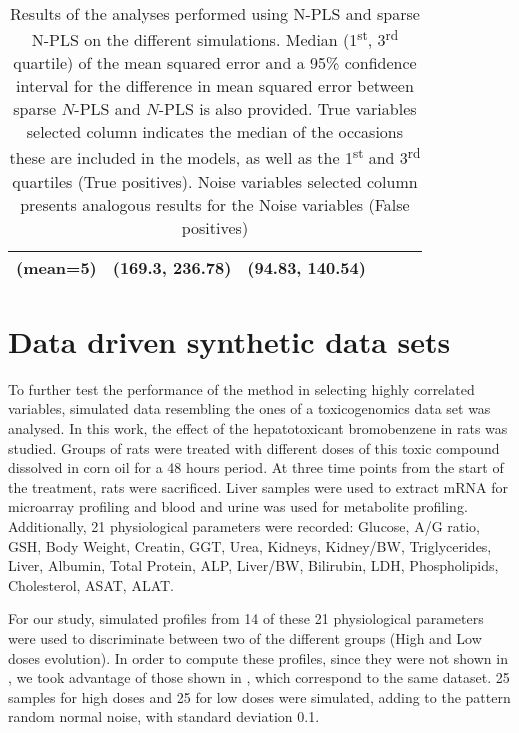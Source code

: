 \begin{table}[hbtp]
{\begin{tabular}{@{}lccccc@{}}
(mean=5)             & (169.3, 236.78)  & (94.83, 140.54) &                                                                           &                                                                            &                                                                             \\ \bottomrule
\end{tabular}%
}
\caption{Results of the analyses performed using N-PLS and sparse N-PLS on the different simulations. Median (1\textsuperscript{st}, 3\textsuperscript{rd} quartile) of the mean squared error and a 95\% confidence interval for the difference in mean squared error between sparse $N$-PLS and $N$-PLS is also provided. True variables selected column indicates the median of the occasions these are included in the models, as well as the 1\textsuperscript{st} and 3\textsuperscript{rd} quartiles (True positives). Noise variables selected column presents analogous results for the Noise variables (False positives)}
\label{table:results_synthetic}
\end{table}

\section{Data driven synthetic data sets}
To further test the performance of the method in selecting highly correlated variables, simulated data resembling the ones of a  toxicogenomics data set \parencite{heijne2004bromobenzene} was analysed. In this work, the effect of the hepatotoxicant bromobenzene in rats was studied. Groups of rats were treated with different doses of this toxic compound dissolved in corn oil for a 48 hours period. At three time points from the start of the treatment, rats were sacrificed. Liver samples were used to extract mRNA for microarray profiling and blood and urine was used for metabolite profiling. Additionally, 21 physiological parameters were recorded: Glucose, A/G ratio, GSH, Body Weight, Creatin, GGT, Urea, Kidneys, Kidney/BW, Triglycerides, Liver, Albumin, Total Protein, ALP, Liver/BW, Bilirubin, LDH, Phospholipids, Cholesterol, ASAT, ALAT. 

For our study, simulated profiles from 14 of these 21 physiological parameters were used to discriminate between two of the different groups (High and Low doses evolution). In order to compute these profiles, since they were not shown in \parencite{heijne2004bromobenzene}, we took advantage of those shown in \cite{conesa2010multiway}, which correspond to the same dataset. 25 samples for high doses and 25 for low doses were simulated, adding to the pattern random normal noise, with standard deviation 0.1.

